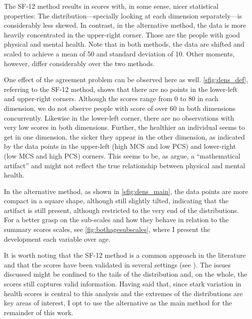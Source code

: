 The SF-12 method results in scores with, in some sense, nicer statistical properties: The distribution---specially
looking at each dimension separately---is considerably less skewed. In contrast, in the alternative method, the
data is more heavily concentrated in the upper-right corner. Those are the people with good physical
and mental health. Note that in both methods, the data are shifted and scaled to achieve a mean of 50 and standard
deviation of 10. Other moments, however, differ considerably over the two methods.

One effect of the agreement problem can be observed here as well. \cref{sfig:dens_def}, referring to the SF-12
method, shows that there are no points in the lower-left and upper-right corners. Although the scores range from 0
to 80 in each dimension, we do not observe people with score of over $60$ in both dimensions concurrently. Likewise
in the lower-left corner, there are no observations with very low scores in both dimensions. Further, the healthier
an individual seems to get in one dimension, the sicker they appear in the other dimension, as indicated by the
data points in the upper-left (high MCS and low PCS) and lower-right (low MCS and high PCS) corners. This seems to
be, as \textcite{tucker.etal2013observed} argue, a ``mathematical artifact'' and might not reflect the true
relationship between physical and mental health.

In the alternative method, as shown in \cref{sfig:dens_main}, the data points are more compact in a square shape,
although still slightly tilted, indicating that the artifact is still present, although restricted to the very end
of the distributions. For a better grasp on the sub-scales and how they behave in relation to the summary scores
scales, see \cref{fig:bothagesubscales}, where I present the development each variable over age.

It is worth noting that the SF-12 method is a common approach in the literature and that the scores have been
validated in several settings (see
\cite{gill.etal2007validity,vilagut.etal2013mental,christensen.etal2013validation}). The issues discussed might be
confined to the tails of the distribution and, on the whole, the scores still captures valid information. Having
said that, since stark variation in health scores is central to this analysis and the extremes of the distributions
are key areas of interest, I opt to use the alternative as the main method for the remainder of this work.


